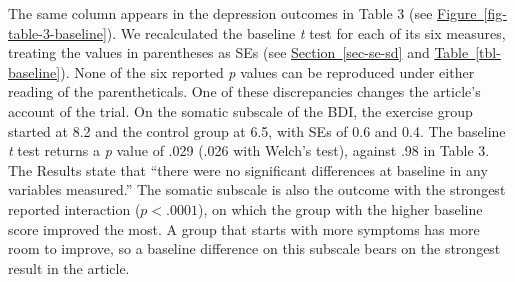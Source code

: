 \documentclass[
  letterpaper,
  DIV=11,
  numbers=noendperiod]{scrartcl}
\begin{document}
The same column appears in the depression outcomes in Table 3 (see
\hyperref[fig-table-3-baseline]{Figure~\ref*{fig-table-3-baseline}}). We
recalculated the baseline \emph{t} test for each of its six measures,
treating the values in parentheses as SEs (see
\hyperref[sec-se-sd]{Section~\ref*{sec-se-sd}} and
\hyperref[tbl-baseline]{Table~\ref*{tbl-baseline}}). None of the six
reported \emph{p} values can be reproduced under either reading of the
parentheticals. One of these discrepancies changes the article's account
of the trial. On the somatic subscale of the BDI, the exercise group
started at 8.2 and the control group at 6.5, with SEs of 0.6 and 0.4.
The baseline \emph{t} test returns a \emph{p} value of .029 (.026 with
Welch's test), against .98 in Table 3. The Results state that ``there
were no significant differences at baseline in any variables measured.''
The somatic subscale is also the outcome with the strongest reported
interaction (\(p < .0001\)), on which the group with the higher baseline
score improved the most. A group that starts with more symptoms has more
room to improve, so a baseline difference on this subscale bears on the
strongest result in the article.
\end{document}
